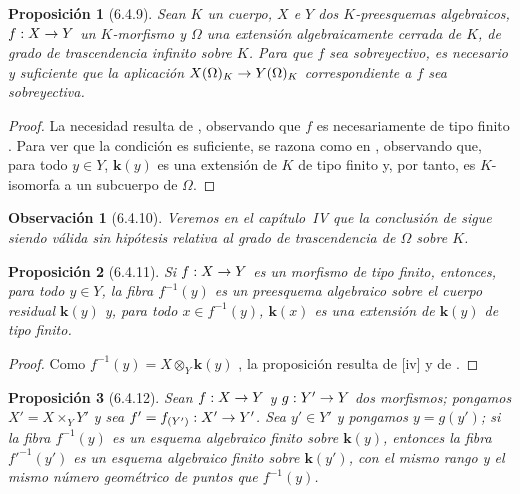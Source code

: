 \documentclass[oneside]{amsart}
\theoremstyle{ega-env-style}
\theoremstyle{ega-thm-env-style}
\newtheorem*{proposition}{Proposición}
\theoremstyle{ega-defn-env-style}
\newtheorem*{remark}{Observación}
\renewcommand{\to}{\mathchoice{\longrightarrow}{\rightarrow}{\rightarrow}{\rightarrow}}
\let\EGAOriginalLabel\label
\renewcommand{\label}[1]{\phantomsection\EGAOriginalLabel{#1}}
\begin{document}
\begin{proposition}[6.4.9]
\label{I.6.4.9}
Sean $K$ un cuerpo, $X$ e $Y$ dos $K$-preesquemas algebraicos, $f:X\to Y$ un $K$-morfismo y $\Omega$ una extensión algebraicamente cerrada de $K$, de grado de trascendencia infinito sobre $K$.
Para que $f$ sea sobreyectivo, es necesario y suficiente que la aplicación $X(\Omega)_K\to Y(\Omega)_K$ correspondiente a $f$  sea sobreyectiva.
\end{proposition}

\begin{proof}
La necesidad resulta de , observando que $f$ es necesariamente de tipo finito .
Para ver que la condición es suficiente, se razona como en , observando que, para todo $y\in Y$, $\boldsymbol{k}(y)$ es una extensión de $K$ de tipo finito y, por tanto, es $K$-isomorfa a un subcuerpo de $\Omega$.
\end{proof}

\begin{remark}[6.4.10]
\label{I.6.4.10}
Veremos en el capítulo~IV que la conclusión de  sigue siendo válida sin hipótesis relativa al grado de trascendencia de $\Omega$ sobre $K$.
\end{remark}

\begin{proposition}[6.4.11]
\label{I.6.4.11}
Si $f:X\to Y$ es un morfismo de tipo finito, entonces, para todo $y\in Y$, la fibra $f^{-1}(y)$ es un preesquema algebraico sobre el cuerpo residual $\boldsymbol{k}(y)$ y, para todo $x\in f^{-1}(y)$, $\boldsymbol{k}(x)$ es una extensión de $\boldsymbol{k}(y)$ de tipo finito.
\end{proposition}

\begin{proof}
Como $f^{-1}(y)=X\otimes_Y \boldsymbol{k}(y)$ , la proposición resulta de [iv] y de .
\end{proof}

\begin{proposition}[6.4.12]
\label{I.6.4.12}
Sean $f:X\to Y$ y $g:Y'\to Y$ dos morfismos;
pongamos $X'=X\times_Y Y'$ y sea $f'=f_{(Y')}:X'\to Y'$.
Sea $y'\in Y'$ y pongamos $y=g(y')$;
si la fibra $f^{-1}(y)$ es un esquema algebraico finito sobre $\boldsymbol{k}(y)$, entonces la fibra $f'^{-1}(y')$ es un esquema algebraico finito sobre $\boldsymbol{k}(y')$, con el mismo rango y el mismo número geométrico de puntos que $f^{-1}(y)$.
\end{proposition}
\end{document}
